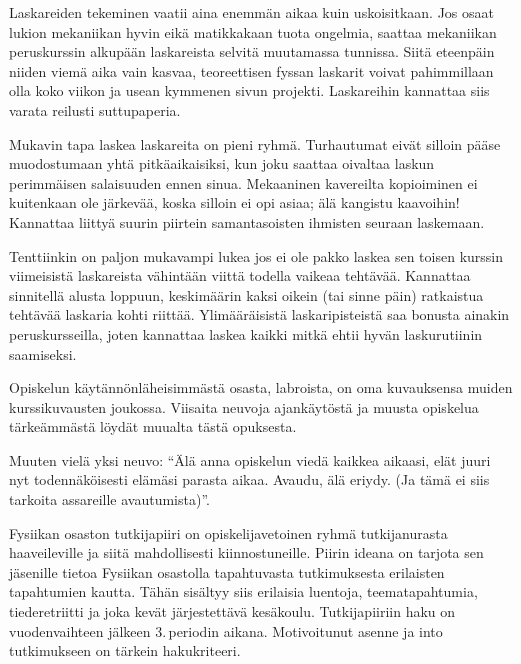 \documentclass[../ala_hataile.tex]{subfiles}
\begin{document}
	Laskareiden tekeminen vaatii aina
	enemmän aikaa kuin uskoisitkaan. Jos
	osaat lukion mekaniikan hyvin eikä matikkakaan
	tuota ongelmia, saattaa mekaniikan
	peruskurssin alkupään laskareista selvitä
	muutamassa tunnissa. Siitä eteenpäin niiden
	viemä aika vain kasvaa, teoreettisen
	fyssan laskarit voivat pahimmillaan olla
	koko viikon ja usean kymmenen sivun projekti.
	Laskareihin kannattaa siis varata reilusti
	suttupaperia.
	
	Mukavin tapa laskea laskareita
	on pieni ryhmä. Turhautumat eivät silloin
	pääse muodostumaan yhtä pitkäaikaisiksi,
	kun joku saattaa oivaltaa laskun perimmäisen
	salaisuuden ennen sinua. Mekaaninen
	kavereilta kopioiminen ei kuitenkaan ole
	järkevää, koska silloin ei opi asiaa; älä kangistu
	kaavoihin! Kannattaa liittyä suurin
	piirtein samantasoisten ihmisten seuraan
	laskemaan.
	
	Tenttiinkin on paljon mukavampi lukea
	jos ei ole pakko laskea sen toisen kurssin
	viimeisistä laskareista vähintään viittä todella
	vaikeaa tehtävää. Kannattaa sinnitellä
	alusta loppuun, keskimäärin kaksi oikein
	(tai sinne päin) ratkaistua tehtävää laskaria
	kohti riittää. Ylimääräisistä laskaripisteistä
	saa bonusta ainakin peruskursseilla, joten
	kannattaa laskea kaikki mitkä ehtii hyvän
	laskurutiinin saamiseksi.
	
	Opiskelun käytännönläheisimmästä
	osasta, labroista, on oma kuvauksensa
	muiden kurssikuvausten joukossa. Viisaita
	neuvoja ajankäytöstä ja muusta opiskelua
	tärkeämmästä löydät muualta tästä opuksesta.
	
	Muuten vielä yksi neuvo: ``Älä anna
	opiskelun viedä kaikkea aikaasi, elät juuri
	nyt todennäköisesti elämäsi parasta aikaa.
	Avaudu, älä eriydy. (Ja tämä ei siis tarkoita
	assareille avautumista)''.
	
	Fysiikan osaston tutkijapiiri on opiskelijavetoinen ryhmä 
	tutkijanurasta haaveileville ja siitä mahdollisesti kiinnostuneille.
	Piirin ideana on tarjota sen jäsenille tietoa Fysiikan osastolla 
	tapahtuvasta tutkimuksesta erilaisten tapahtumien kautta. Tähän sisältyy
	siis erilaisia luentoja, teema\-tapahtumia, tiede\-retriitti ja joka kevät 
	järjestettävä kesä\-koulu. Tutkijapiiriin haku on vuoden\-vaihteen jälkeen 
	3.\,periodin aikana. Motivoitunut asenne ja into tutkimukseen on 
	tärkein haku\-kriteeri.
	
\end{document}
